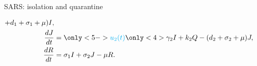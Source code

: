 \begin{frame}{SARS: isolation and quarantine}
{\begin{textblock*}{65mm}
\begin{equation*}
\begin{aligned}
                + d_1  + \sigma_1 
                + \mu) I,
            \\
            \dfrac{dJ}{dt} &=
                \only<5->{
                    \textcolor{cyan}{u_2(t)}
                }
                \only<4>{\gamma_2}  
                  I 
                + k_2 Q
                - (d_2 + \sigma_2 + \mu) J,
            \\
            \dfrac{dR}{dt} &=
                \sigma_1 I
                +\sigma_2 J
                - \mu R.
        \end{aligned}
     \end{equation*}
    \end{textblock*}
    }
    
\end{frame}